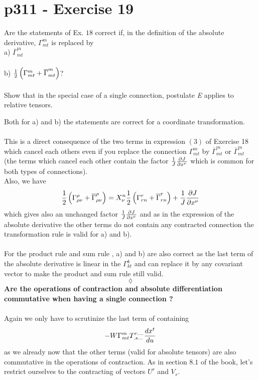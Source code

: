 \section{p311 - Exercise 19}
\begin{tcolorbox}
Are the statements of Ex. $18$ correct if, in the definition of the absolute derivative, $\Gamma^m_{mt}$ is replaced by \\
a) $\overline{\Gamma}^m_{mt}$\\\\
b) $\frac{1}{2}\left(\Gamma^m_{mt}+ \overline{\Gamma}^m_{mt}\right)$?\\\\
Show that in the special case  of a single connection, postulate \textit{E} applies to relative tensors.
\end{tcolorbox}
Both for a) and b) the statements are correct for a coordinate transformation. \\\\
This is a direct consequence of the two terms in expression $(3)$ of Exercise 18 which cancel each others even if you replace the connection $\Gamma^m_{mt}$ by $\overline{\Gamma}^m_{mt}$ or $\overline{\Gamma}^m_{mt}$ (the terms which cancel each other contain the factor $\frac{1}{J}\pdv{J}{x^{\nu}}$ which is common for both types of connections). \\
Also, we have
$$\frac{1}{2}\left(\Gamma^{\rho}_{\rho\nu}+\overline{\Gamma}^{\rho}_{\rho\nu}\right)= X^{n}_{\nu}\frac{1}{2}\left(\Gamma^r_{rn}+\overline{\Gamma}^r_{rn}\right) + \frac{1}{J}\pdv{J}{x^{\nu}}$$ 
which gives also an unchanged factor $\frac{1}{J}\pdv{J}{x^{\nu}}$  and as in the expression of the absolute derivative the other terms do not contain any contracted connection the transformation rule is valid for a) and b).\\\\
For the product rule and sum rule , a) and b) are  also correct as the last term of the absolute derivative is linear in the $\Gamma^k_{kt}$ and can replace it by any covariant vector to make the product and sum rule still valid.
$$\lozenge$$
\textbf{Are the operations of contraction and absolute differentiation commutative when having a single connection ?}\\\\
Again we only have to scrutinize the last term of containing 
$$-W\Gamma^m_{mt}T^{r . \dots}_{.s\dots}\dv{x^t}{u}$$ as we already now that the other terms (valid for absolute tensors) are also commutative in the operations of contraction.
As in section $8.1$ of the book, let's restrict ourselves to the contracting of vectors $U^r$ and $V_s$. 
